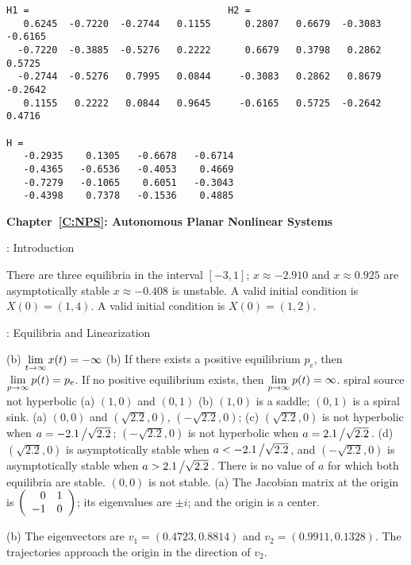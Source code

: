 \ans
\begin{verbatim}
H1 =                                   H2 =
   0.6245  -0.7220  -0.2744   0.1155      0.2807   0.6679  -0.3083  -0.6165
  -0.7220  -0.3885  -0.5276   0.2222      0.6679   0.3798   0.2862   0.5725
  -0.2744  -0.5276   0.7995   0.0844     -0.3083   0.2862   0.8679  -0.2642
   0.1155   0.2222   0.0844   0.9645     -0.6165   0.5725  -0.2642   0.4716

H =
   -0.2935    0.1305   -0.6678   -0.6714
   -0.4365   -0.6536   -0.4053    0.4669
   -0.7279   -0.1065    0.6051   -0.3043
   -0.4398    0.7378   -0.1536    0.4885
\end{verbatim}


\vspace{0.08in}
{\bf Chapter~\ref{C:NPS}: Autonomous Planar Nonlinear Systems}

: Introduction

There are three equilibria in the interval $[-3,1]$; $x\approx -2.910$ 
and $x\approx 0.925$ are asymptotically stable 
$x \approx -0.408$ is unstable.
 A valid initial condition is $X(0) = (1,4)$. 
 A valid initial condition is $X(0) = (1,2)$. 


: Equilibria and Linearization

 (b) \ans $\displaystyle\lim_{t \to \infty} x(t) = -\infty$
(b) \ans If there exists a positive equilibrium $p_e$, then
$\displaystyle\lim_{p \to \infty} p(t) = p_e$.  If no positive equilibrium
exists, then $\displaystyle\lim_{p \to \infty} p(t) = \infty$.
 \ans spiral source
 \ans not hyperbolic
(a) \ans $(1,0)$ and $(0,1)$
(b) \ans $(1,0)$ is a saddle; $(0,1)$ is a spiral sink.
(a) $(0,0)$ and $(\sqrt{2.2},0)$, $(-\sqrt{2.2},0)$;
(c) \ans $(\sqrt{2.2},0)$ is not hyperbolic when $a = -2.1\left/\sqrt{2.2}\right.$; 
$(-\sqrt{2.2},0)$ is not hyperbolic when $a = 2.1\left/\sqrt{2.2}\right.$.
(d) \ans $(\sqrt{2.2},0)$ is asymptotically stable when
$a < -2.1\left/\sqrt{2.2}\right.$, and 
$(-\sqrt{2.2},0)$ is asymptotically stable when
$a > 2.1\left/\sqrt{2.2}\right.$.  There is no value of $a$ for which
both equilibria are stable.  $(0,0)$ is not stable.
(a) The Jacobian matrix at the origin is $\left(\begin{array}{rr} 0 & 1\\ -1 &0\end{array}\right)$; 
its eigenvalues are $\pm i$; and the origin is a center.

(b) The eigenvectors are $v_1 = (0.4723,0.8814)$ and $v_2 = (0.9911,0.1328)$.
The trajectories approach the origin in the direction of $v_2$.


